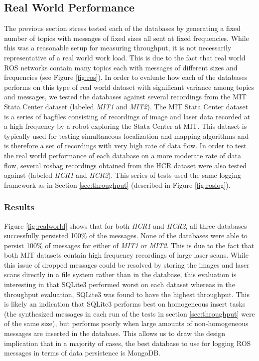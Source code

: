 \documentclass[nocopyrightspace]{acm_proc_article-sp}
\begin{document}
\subsection{Real World Performance}
\label{sec:realworld}
The previous section stress tested each of the databases by generating a fixed number of topics with messages of fixed sizes all sent at fixed frequencies. While this was a reasonable setup for measuring throughput, it is not necessarily representative of a real world work load. This is due to the fact that real world ROS networks contain many topics each with messages of different sizes and frequencies (see Figure \ref{fig:ros}). In order to evaluate how each of the databases performs on this type of real world dataset with significant variance among topics and messages, we tested the databases against several recordings from the MIT Stata Center dataset (labeled \textit{MIT1} and \textit{MIT2}). The MIT Stata Center dataset is a series of bagfiles consisting of recordings of image and laser data recorded at a high frequency by a robot exploring the Stata Center at MIT. This dataset is typically used for testing simultaneous localization and mapping algorithms and is therefore a set of recordings with very high rate of data flow. In order to test the real world performance of each database on a more moderate rate of data flow, several rosbag recordings obtained from the HCR dataset were also tested against (labeled \textit{HCR1} and \textit{HCR2}). This series of tests used the same logging framework as in Section \ref{sec:throughput} (described in Figure \ref{fig:roslog}).

\subsubsection{Results}
Figure \ref{fig:realworld} shows that for both \textit{HCR1} and \textit{HCR2}, all three databases successfully persisted 100\% of the messages. None of the databases were able to persist 100\% of messages for either of \textit{MIT1} or \textit{MIT2}. This is due to the fact that both MIT datasets contain high frequency recordings of large laser scans. While this issue of dropped messages could be resolved by storing the images and laser scans directly in a file system rather than in the database, this evaluation is interesting in that SQLite3 performed worst on each dataset whereas in the throughput evaluation, SQLite3 was found to have the highest throughput. This is likely an indication that SQLite3 performs best on homogeneous insert tasks (the synthesized messages in each run of the tests in section \ref{sec:throughput} were of the same size), but performs poorly when large amounts of non-homogeneous messages are inserted in the database. This allows us to draw the design implication that in a majority of cases, the best database to use for logging ROS messages in terms of data persistence is MongoDB.
\end{document}
